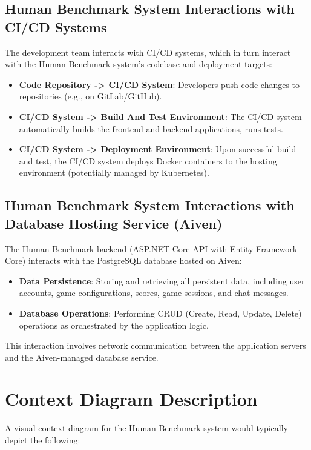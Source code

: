 \subsection{Human Benchmark System Interactions with CI/CD Systems}
The development team interacts with CI/CD systems, which in turn interact with the Human Benchmark system's codebase and deployment targets:
\begin{itemize}
    \item \textbf{Code Repository -> CI/CD System}: Developers push code changes to repositories (e.g., on GitLab/GitHub).
    \item \textbf{CI/CD System -> Build And Test Environment}: The CI/CD system automatically builds the frontend and backend applications, runs tests.
    \item \textbf{CI/CD System -> Deployment Environment}: Upon successful build and test, the CI/CD system deploys Docker containers to the hosting environment (potentially managed by Kubernetes).
\end{itemize}

\subsection{Human Benchmark System Interactions with Database Hosting Service (Aiven)}
The Human Benchmark backend (ASP.NET Core API with Entity Framework Core) interacts with the PostgreSQL database hosted on Aiven:
\begin{itemize}
    \item \textbf{Data Persistence}: Storing and retrieving all persistent data, including user accounts, game configurations, scores, game sessions, and chat messages.
    \item \textbf{Database Operations}: Performing CRUD (Create, Read, Update, Delete) operations as orchestrated by the application logic.
\end{itemize}
This interaction involves network communication between the application servers and the Aiven-managed database service.

\section{Context Diagram Description}
A visual context diagram for the Human Benchmark system would typically depict the following:

